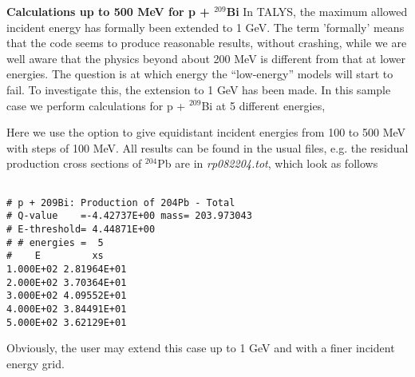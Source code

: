 \begin{samplecase}
{\bf Calculations up to 500 MeV for p + ${}^{209}$Bi}\newline
In TALYS, the maximum allowed incident energy has formally been extended to 1 GeV. 
The term 'formally' means that the code seems to produce reasonable results, without 
crashing, while we are well aware that the physics beyond about 200 MeV is different 
from that at lower energies. The question is at which energy 
the ``low-energy'' models will 
start to fail. To investigate this, the extension to 1 GeV has been made.
In this sample case we perform calculations for p + ${}^{209}$Bi at 5 different 
energies,


Here we use the option to give equidistant incident energies from 100 to 500 MeV with 
steps of 100 MeV.
All results can be found in the usual files, e.g. the residual production cross 
sections of $^{204}$Pb are in {\it rp082204.tot}, which look as follows
{\small \begin{verbatim}

# p + 209Bi: Production of 204Pb - Total
# Q-value    =-4.42737E+00 mass= 203.973043
# E-threshold= 4.44871E+00
# # energies =  5
#    E         xs
1.000E+02 2.81964E+01
2.000E+02 3.70364E+01
3.000E+02 4.09552E+01
4.000E+02 3.84491E+01
5.000E+02 3.62129E+01
\end{verbatim} } \renewcommand{\baselinestretch}{1.07}\small\normalsize
\noindent
Obviously, the user may extend this case up to 1 GeV and with a finer incident energy 
grid.
\end{samplecase}
